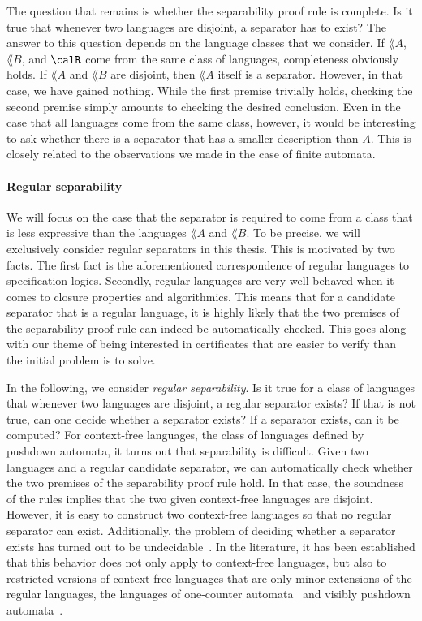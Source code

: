 \documentclass[../../diss.tex]{subfiles}
\begin{document}
The question that remains is whether the separability proof rule is complete.
Is it true that whenever two languages are disjoint, a separator has to exist?
The answer to this question depends on the language classes that we consider.
If $\lang{A}$, $\lang{B}$, and $\calR$ come from the same class of languages, completeness obviously holds.
If $\lang{A}$ and $\lang{B}$ are disjoint, then $\lang{A}$ itself is a separator.
However, in that case, we have gained nothing.
While the first premise trivially holds, checking the second premise simply amounts to checking the desired conclusion.
Even in the case that all languages come from the same class, however, it would be interesting to ask whether there is a separator that has a smaller description than $A$.
This is closely related to the observations we made in the case of finite automata.

\paragraph{Regular separability}

We will focus on the case that the separator is required to come from a class that is less expressive than the languages $\lang{A}$ and $\lang{B}$.
To be precise, we will exclusively consider regular separators in this thesis.
This is motivated by two facts.
The first fact is the aforementioned correspondence of regular languages to specification logics.
Secondly, regular languages are very well-behaved when it comes to closure properties and algorithmics.
This means that for a candidate separator that is a regular language, it is highly likely that the two premises of the separability proof rule can indeed be automatically checked.
This goes along with our theme of being interested in certificates that are easier to verify than the initial problem is to solve.

In the following, we consider \emph{regular separability}.
Is it true for a class of languages that whenever two languages are disjoint, a regular separator exists?
If that is not true, can one decide whether a separator exists?
If a separator exists, can it be computed?
For context-free languages, the class of languages defined by pushdown automata, it turns out that separability is difficult.
Given two languages and a regular candidate separator, we can automatically check whether the two premises of the separability proof rule hold.
In that case, the soundness of the rules implies that the two given context-free languages are disjoint.
However, it is easy to construct two context-free languages so that no regular separator can exist.
Additionally, the problem of deciding whether a separator exists has turned out to be undecidable~\cite{SzymanskiW76}.
In the literature, it has been established that this behavior does not only apply to context-free languages, but also to restricted versions of context-free languages that are only minor extensions of the regular languages, \eg the languages of one-counter automata~\cite{CzerwinskiL17} and visibly pushdown automata~\cite{Kopczynski16}.
\end{document}
